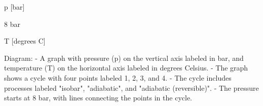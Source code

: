 p [bar]

8 bar

T [degrees C]

Diagram:
- A graph with pressure (p) on the vertical axis labeled in bar, and temperature (T) on the horizontal axis labeled in degrees Celsius.
- The graph shows a cycle with four points labeled 1, 2, 3, and 4.
- The cycle includes processes labeled "isobar", "adiabatic", and "adiabatic (reversible)". 
- The pressure starts at 8 bar, with lines connecting the points in the cycle.